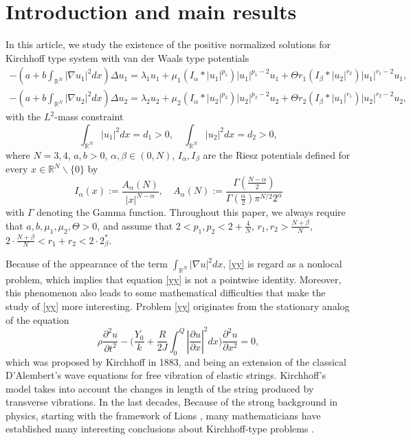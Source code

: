 \documentclass[reqno]{amsart}
\begin{document}
\section{Introduction and main results}

In this article, we study the existence of the positive normalized solutions for
Kirchhoff type system with van der Waals type potentials
\begin{equation}\label{yy}
\begin{gathered}
-(a+b\int_{\mathbb{R}^N}|\nabla u_1|^2dx)\Delta u_1
=\lambda_1 u_1+\mu_1(I_\alpha\ast|u_1|^{p_1})|u_1|^{p_1-2}u_1+
 \Theta r_1(I_\beta\ast|u_2|^{r_2})|u_1|^{r_1-2}u_1, \\
-(a+b\int_{\mathbb{R}^N}|\nabla u_2|^2dx)\Delta u_2
=\lambda_2 u_2+\mu_2(I_\alpha\ast|u_2|^{p_2})|u_2|^{p_2-2}u_2+
 \Theta r_2(I_\beta\ast|u_1|^{r_1})|u_2|^{r_2-2}u_2,
\end{gathered}
\end{equation}
with the $L^2$-mass constraint
\begin{equation}\label{yues}
 \int_{\mathbb{R}^N}|u_1|^2dx=d_1>0,\quad
 \int_{\mathbb{R}^N}|u_2|^2dx=d_2>0,
\end{equation}
where $N=3,4$, $a,b>0$, $\alpha,\beta\in(0,N)$, $I_\alpha,I_\beta$ are the Riesz
potentials defined for every $x\in\mathbb{R}^N\backslash\{0\}$ by
\begin{equation}\label{gamma}
 I_\alpha(x):=\frac{A_\alpha(N)}{|x|^{N-\alpha}},\quad
 A_\alpha(N):=\frac{\Gamma(\frac{N-\alpha}{2})}{\Gamma(\frac{\alpha}{2})\pi^{N/2}
 2^\alpha}
\end{equation}
with $\Gamma$ denoting the Gamma function. Throughout this paper, we always require
that $a,b,\mu_1,\mu_2,\Theta>0$, and assume that $2<p_1,p_2
<2+\frac{4}{N}$, $r_1,r_2>\frac{N+\beta}{N}$,
$2\cdot\frac{N+\beta}{N}<r_1+r_2<2\cdot2_\beta^*$.

Because of the appearance of the term $\int_{\mathbb{R}^N}|\nabla u|^2dx$,
\eqref{yy} is regard as a nonlocal problem, which implies that equation \eqref{yy}
is not a pointwise identity. Moreover, this phenomenon also leads to some mathematical
difficulties that make the study of \eqref{yy} more interesting.
Problem \eqref{yy} originates
from the stationary analog of the equation
\[
\rho\frac{\partial^2 u}{\partial t^2}
-\Big(\frac{Y_0}{k}+\frac{R}{2J}\int_{0}^{Q}|\frac{\partial u}{\partial x}|^2dx\Big)
\frac{\partial^2 u}{\partial x^2}=0,
\]
which was proposed by Kirchhoff \cite{Kf4} in 1883, and being an extension of the
classical D'Alembert's wave equations for free vibration of elastic strings.
Kirchhoff's model takes into account the changes in length of the string produced by
transverse vibrations. In the last decades, Because of the strong background in physics,
starting with the framework of Lions \cite{Li4}, many mathematicians have established
many interesting conclusions about Kirchhoff-type problems
\cite{Kf1,Kf2,Kf3,Kf4,Kf5,Kf6,ygg,guo1,guo2}.
\end{document}
